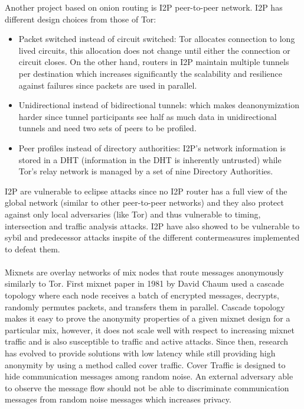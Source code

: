 Another project based on onion routing is I2P peer-to-peer network. I2P has different design choices from those of Tor:
\begin{itemize}
    \item Packet switched instead of circuit switched: Tor allocates connection to long lived circuits, this allocation does not change until either the connection or circuit closes. On the other hand, routers in I2P maintain multiple tunnels per destination which increases significantly the scalability and resilience against failures since packets are used in parallel.
    \item Unidirectional instead of bidirectional tunnels: which makes deanonymization harder since tunnel participants see half as much data in unidirectional tunnels and need two sets of peers to be profiled.
    \item Peer profiles instead of directory authorities: I2P’s network information is stored in a DHT (information in the DHT is inherently untrusted) while Tor’s relay network is managed by a set of nine Directory Authorities.

\end{itemize}
I2P are vulnerable to eclipse attacks since no I2P router has a full view of the global network (similar to other peer-to-peer networks) and they also protect against only local adversaries (like Tor) and thus vulnerable to timing, intersection and traffic analysis attacks. I2P have also showed to be vulnerable to sybil and predecessor attacks inspite of the different contermeasures implemented to defeat them.
\\~\\Mixnets are overlay networks of mix nodes that route messages anonymously similarly to Tor. First mixnet paper in 1981 by David Chaum used a cascade topology where each node receives a batch of encrypted messages, decrypts, randomly permutes packets, and transfers them in parallel. Cascade topology makes it easy to prove the anonymity properties of a given mixnet design for a particular mix, however, it does not scale well with respect to increasing mixnet traffic and is also susceptible to traffic and active attacks. Since then, research has evolved to provide solutions with low latency while still providing high anonymity by using a method called cover traffic. Cover Traffic is designed to hide communication messages among random noise. An external adversary able to observe the message flow should not be able to discriminate communication messages from random noise messages which increases privacy. 

